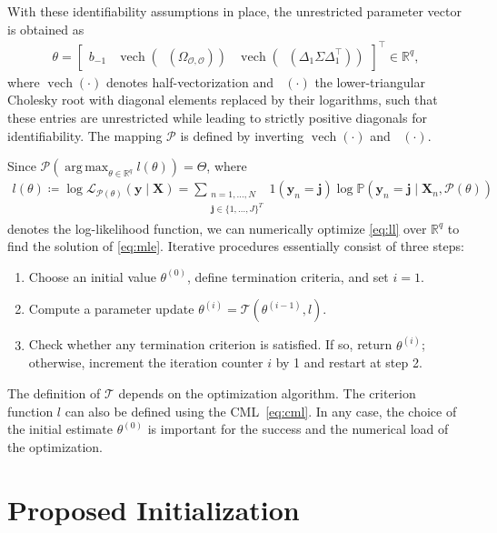 \documentclass[preprint,12pt,authoryear]{elsarticle}
\newcommand{\R}{\mathbb{R}}
\newcommand{\Oset}{{\mathcal O}}
\renewcommand{\Pr}{\mathbb{P}}
\DeclareMathOperator*{\argmax}{arg\,max}
\DeclareMathOperator*{\vech}{vech}
\DeclareMathOperator*{\chol}{chol^\ast}
\begin{document}
With these identifiability assumptions in place, the unrestricted parameter vector is obtained as
%
\begin{align*}
    \theta = \begin{bmatrix} b_{-1} & \vech(\chol(\Omega_{\Oset,\Oset})) & \vech(\chol(\Delta_1 \Sigma \Delta_1^\top)) \end{bmatrix}^\top \in \R^q,
\end{align*}
%
where $\vech(\cdot)$ denotes half-vectorization and $\chol(\cdot)$ the lower-triangular Cholesky root with diagonal elements replaced by their logarithms, such that these entries are unrestricted while leading to strictly positive diagonals for identifiability. The mapping $\mathcal{P}$ is defined by inverting $\vech(\cdot)$ and $\chol(\cdot)$.

Since $\mathcal{P}(\argmax_{\theta \in \R^q}l(\theta)) = \hat{\Theta}$, where
%
\begin{align}
    \label{eq:ll}
    l(\theta) \coloneq \log \mathcal{L}_{\mathcal{P}(\theta)}(\bm{y} \mid \bm{X}) = \sum_{\substack{n = 1,\dots,N \\ \bm{j} \in \{1,\dots,J\}^T}} 1(\bm{y}_n = \bm{j}) \log \Pr \left( \bm{y}_n = \bm{j} \mid \bm{X}_n, \mathcal{P}(\theta) \right)
\end{align}
%
denotes the log-likelihood function, we can numerically optimize \eqref{eq:ll} over $\R^q$ to find the solution of \eqref{eq:mle}. Iterative procedures essentially consist of three steps:
%
\begin{enumerate}
    \item Choose an initial value $\theta^{(0)}$, define termination criteria, and set $i = 1$.
    \item Compute a parameter update $\theta^{(i)} = \mathcal{T}(\theta^{(i-1)}, l)$.
    \item Check whether any termination criterion is satisfied. If so, return $\theta^{(i)}$; otherwise, increment the iteration counter $i$ by 1 and restart at step 2.
\end{enumerate}
%
The definition of $\mathcal{T}$ depends on the optimization algorithm. The criterion function $l$ can also be defined using the CML~\eqref{eq:cml}.
In any case, the choice of the initial estimate $\theta^{(0)}$ is important for the success and the numerical load of the optimization.

\section{Proposed Initialization}\label{sec:initialization}
\end{document}
